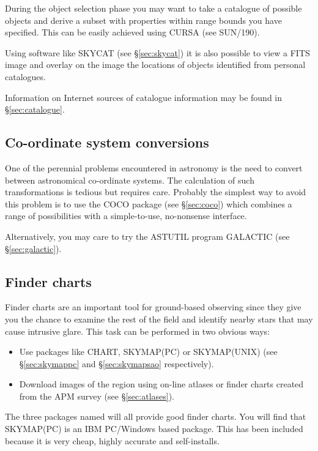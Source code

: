 \documentclass[twoside,11pt]{article}
\newcommand{\htmladdnormallink}[2]{#1}
\newcommand{\xref}[3]{#1}
\newcommand{\xlabel}[1]{}
\newcommand{\COCOref}{\xref{COCO}{sun56}{}}
\newcommand{\SKYMAPPCref}{\htmladdnormallink{SKYMAP(PC)}{http://www.skymap.com}}
\newcommand{\SKYMAPUNIXref}{\htmladdnormallink{SKYMAP(UNIX)}{http://tdc-www.harvard.edu/software/skymap.html}}
\newcommand{\CURSAref}{\xref{CURSA}{sun190}{}}
\newcommand{\CHARTref}{\xref{CHART}{sun32}{}}
\newcommand{\SKYCATref}{\htmladdnormallink{SKYCAT}{http://arch-http.hq.eso.org/skycat/}}
\newcommand{\APMref}{\htmladdnormallink{APM}{\tt http://www.ast.cam.ac.uk/\~{}rgm/apm_catalogues.html}}
\begin{document}
During the object selection phase you may want to take a catalogue of possible
objects and derive a subset with properties within range bounds you
have specified. This can be easily achieved using {\CURSAref} (see
SUN/190).

Using software like {\SKYCATref} (see \S{\ref{sec:skycat}})
it is also possible to view a FITS image
and overlay on the image the locations of objects identified from personal
catalogues.

Information on Internet sources of catalogue information may be found in \S{\ref{sec:catalogue}}.

\subsection{Co-ordinate system conversions} \xlabel{CORDS}
\label{sec:cords}

One of the perennial problems encountered in astronomy is the need to convert
between astronomical co-ordinate systems. The calculation of such transformations is tedious but
requires care. Probably the simplest way to avoid this problem is to use the
{\COCOref} package (see \S{\ref{sec:coco}}) which combines
a range of possibilities with a simple-to-use, no-nonsense interface.

Alternatively, you may care to try the ASTUTIL program GALACTIC (see \S{\ref{sec:galactic}}).


\subsection{Finder charts} \xlabel{FINDERC}
\label{sec:finderc}

Finder charts are an important tool for ground-based observing since
they give you the chance to examine the rest of the field and
identify nearby stars that may cause intrusive glare. This task can be performed
in two obvious ways:

\begin{itemize}
\item Use packages like {\CHARTref},
{\SKYMAPPCref} or {\SKYMAPUNIXref} (see \S{\ref{sec:skymappc}} and \S{\ref{sec:skymapsao}} respectively).

\item Download images of the region using on-line atlases
or finder charts created from the {\APMref} survey (see \S{\ref{sec:atlases}}).
\end{itemize}

The three packages named will all provide good finder charts.
You will find that {\SKYMAPPCref} is an IBM PC/Windows based package.
This has been included because it is very cheap, highly accurate and
self-installs.
\end{document}
